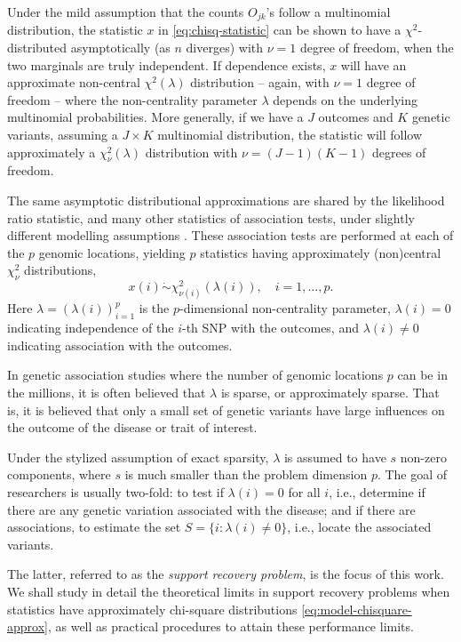 Under the mild assumption that the counts $O_{jk}$'s follow a multinomial distribution, the statistic $x$ in \eqref{eq:chisq-statistic} can be shown to have a $\chi^2$-distributed asymptotically (as $n$ diverges) with $\nu=1$ degree of freedom, when the two marginals are truly independent.
If dependence exists, $x$ will have an approximate non-central $\chi^2(\lambda)$ distribution -- again, with $\nu=1$ degree of freedom -- where the non-centrality parameter $\lambda$ depends on the underlying multinomial probabilities.
More generally, if we have a $J$ outcomes and $K$ genetic variants, assuming a $J\times K$ multinomial distribution, the statistic will follow approximately a $\chi^2_{\nu}(\lambda)$ distribution with $\nu = (J-1)(K-1)$ degrees of freedom.

The same asymptotic distributional approximations are shared by the likelihood ratio statistic, and many other statistics of association tests, under slightly different modelling assumptions \cite{gao2019upass}.
These association tests are performed at each of the $p$ genomic locations, yielding $p$ statistics having approximately (non)central $\chi^2_{\nu}$ distributions,
\begin{equation} \label{eq:model-chisquare-approx}
    x(i) \mathrel{\dot\sim} \chi_{\nu(i)}^2\left(\lambda(i)\right), \quad i=1,\ldots,p.
\end{equation}
Here $\lambda = (\lambda(i))_{i=1}^p$ is the $p$-dimensional non-centrality parameter, $\lambda(i)=0$ indicating independence of the $i$-th SNP with the outcomes, and $\lambda(i)\neq0$ indicating association with the outcomes.

In genetic association studies where the number of genomic locations $p$ can be in the millions, it is often believed that $\lambda$ is sparse, or approximately sparse.
That is, it is believed that only a small set of genetic variants have large influences on the outcome of the disease or trait of interest.

Under the stylized assumption of exact sparsity, $\lambda$ is assumed to have $s$ non-zero components, where $s$ is much smaller than the problem dimension $p$. 
The goal of researchers is usually two-fold: to test if $\lambda(i)=0$ for all $i$, i.e., determine if there are any genetic variation associated with the disease; and if there are associations, to estimate the set $S=\{i:\lambda(i)\neq 0\}$, i.e., locate the associated variants.

The latter, referred to as the \emph{support recovery problem}, is the focus of this work.
We shall study in detail the theoretical limits in support recovery problems when statistics have approximately chi-square distributions \eqref{eq:model-chisquare-approx}, as well as practical procedures to attain these performance limits.

